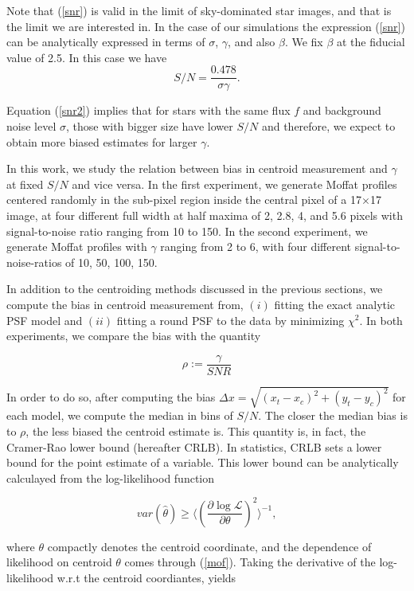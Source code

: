 \documentclass[12pt, preprint]{aastex}
\newcommand{\beq}{\begin{equation}}
\newcommand{\eeq}{\end{equation}}
\begin{document}
Note that (\ref{snr}) is valid in the limit of sky-dominated star images, and that is the limit we are interested in. In the case of our simulations the expression (\ref{snr}) can be analytically expressed in terms of $\sigma$, $\gamma$, and also $\beta$. We fix $\beta$ at the fiducial value of 2.5. In this case we have
\beq
S/N = \frac{0.478}{\sigma \gamma}.
\label{snr2}
\eeq

Equation (\ref{snr2}) implies that for stars with the same flux $f$ and background noise level $\sigma$, those with bigger size have lower $S/N$ and therefore, we expect to obtain more biased estimates for larger $\gamma$. 

In this work, we study the relation between bias in centroid measurement and $\gamma$ at fixed $S/N$ and vice versa. In the first experiment, we generate Moffat profiles centered randomly in the sub-pixel region inside the central pixel of a 17$\times$17 image, at four different full width at half maxima of 2, 2.8, 4, and 5.6 pixels with signal-to-noise ratio ranging from 10 to 150. In the second experiment, we generate Moffat profiles with $\gamma$ ranging from 2 to 6, with four different signal-to-noise-ratios of 10, 50, 100, 150.

In addition to the centroiding methods discussed in the previous sections, we compute the bias in centroid measurement from, $(i)$ fitting the exact analytic PSF model and $(ii)$ fitting a round PSF to the data by minimizing $\chi^{2}$. In both experiments, we compare the bias with the quantity

\beq
\rho := \frac{\gamma}{SNR}
\eeq

In order to do so, after computing the bias $\Delta x = \sqrt{(x_{t}-x_{c})^2 + (y_{t}-y_{c})^2}$ for each model, we compute the median in bins of $S/N$. The closer the median bias is to $\rho$, the less biased the centroid estimate is. This quantity is, in fact, the Cramer-Rao lower bound (hereafter CRLB). In statistics, CRLB sets a lower bound for the point estimate of a variable. This lower bound can be analytically calculayed from the log-likelihood function 

\beq
var(\hat{\theta}) \geq \langle (\frac{\partial \log \mathcal{L}}{\partial \theta})^{2}\rangle^{-1},
\eeq

where $\theta$ compactly denotes the centroid coordinate, and the dependence of likelihood on centroid $\theta$ comes through (\ref{mof}). Taking the derivative of the log-likelihood w.r.t the centroid coordiantes, yields
\end{document}

